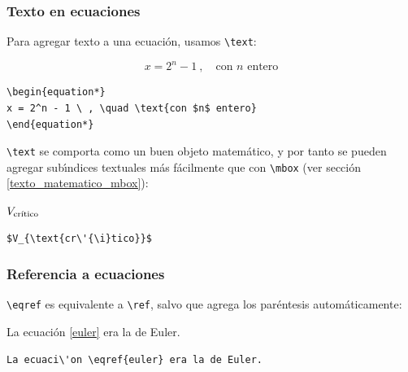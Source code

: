 {\subsubsection{Texto en ecuaciones}

Para agregar texto a una ecuaci\'on, usamos \verb+\text+:

\vspace{.3cm}
{\small
\begin{minipage}[c]{5cm}
\begin{equation*}
x = 2^n - 1  \ , \quad \text{con $n$ entero}
\end{equation*}
\end{minipage}
\hspace{2cm}
\begin{minipage}[t]{5cm}
\begin{verbatim}
\begin{equation*}
x = 2^n - 1 \ , \quad \text{con $n$ entero}
\end{equation*}
\end{verbatim}
\end{minipage}
}
\vspace{.3cm}

\verb+\text+ se comporta como un buen objeto matem\'atico, y por tanto
se pueden agregar sub\'{\i}ndices textuales m\'as f\'acilmente que con
\verb+\mbox+ (ver secci\'on \ref{texto_matematico_mbox}):

\vspace{.3cm}
{\small
\begin{minipage}[c]{5cm}
$V_{\text{cr\'{\i}tico}}$
\end{minipage}
\hspace{2cm}
\begin{minipage}[t]{5cm}
\begin{verbatim}
$V_{\text{cr\'{\i}tico}}$
\end{verbatim}
\end{minipage}
}
\vspace{.3cm}

\subsubsection{Referencia a ecuaciones}

\verb+\eqref+ es equivalente a \verb+\ref+, salvo que agrega los
par\'entesis autom\'aticamente:

\vspace{.3cm}
{\small
\begin{minipage}[c]{5cm}
La ecuaci\'on \eqref{euler} era la de Euler.
\end{minipage}
\hspace{2cm}
\begin{minipage}[t]{5cm}
\begin{verbatim}
La ecuaci\'on \eqref{euler} era la de Euler.
\end{verbatim}
\end{minipage}
}
\vspace{.3cm}



}
